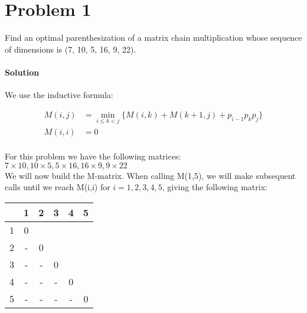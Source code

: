 \documentclass[12pt]{article}
\begin{document}
\maketitle


\section{Problem 1}
 Find an optimal parenthesization of a matrix chain multiplication whose sequence of dimensions is (7, 10, 5, 16, 9, 22). 
\paragraph{Solution}
We use the inductive formula:

\begin{align*}
M(i,j) & = \min_{i \leq k < j} \{ M(i,k) + M(k+1,j) + p_{i-1}p_{k}p_{j} \}   \\
M(i,i) &= 0\\
\end{align*}

For this problem we have the following matrices:\\
$7 \times 10, 10\times 5, 5 \times 16, 16 \times 9, 9 \times 22$\\
We will now build the M-matrix.
When calling M(1,5), we will make subsequent calls until we reach M(i,i) for $i = 1,2,3,4,5$, giving the following matrix:\\

\begin{table}[h]
\centering
\begin{tabular}{|c|c|c|c|c|c|}
\hline
\multicolumn{1}{|l|}{} & \multicolumn{1}{|l|}{1} & \multicolumn{1}{l|}{2} & \multicolumn{1}{l|}{3} & \multicolumn{1}{l|}{4} & \multicolumn{1}{l|}{5} \\ \hline
1&0                       &                      &                       &                       &                   \\ \hline
2&-                       & 0                     &                       &                       &                   \\ \hline
3&-                       & -                     & 0                     &                       &                       \\ \hline
4&-                       & -                     & -                     & 0                     &                       \\ \hline
5&-                       & -                     & -                     & -                     &    0                   \\ \hline
\end{tabular}
\end{table}
\end{document}
